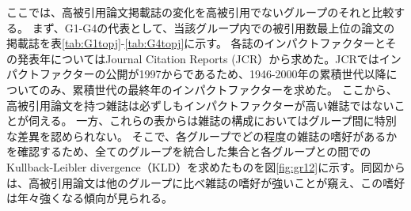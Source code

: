 ここでは、高被引用論文掲載誌の変化を高被引用でないグループのそれと比較する。
まず、G1-G4の代表として、当該グループ内での被引用数最上位の論文の掲載誌を表\ref{tab:G1topj}-\ref{tab:G4topj}に示す。
各誌のインパクトファクターとその発表年についてはJournal Citation Reports  (JCR）\cite{JCR1}から求めた。JCRではインパクトファクターの公開が1997からであるため、1946-2000年の累積世代以降についてのみ、累積世代の最終年のインパクトファクターを求めた。
ここから、高被引用論文を持つ雑誌は必ずしもインパクトファクターが高い雑誌ではないことが伺える。
一方、これらの表からは雑誌の構成においてはグループ間に特別な差異を認められない。
そこで、各グループでどの程度の雑誌の嗜好があるかを確認するため、全てのグループを統合した集合と各グループとの間でのKullback-Leibler divergence（KLD）を求めたものを図\ref{fig:gr12}に示す。同図からは、高被引用論文は他のグループに比べ雑誌の嗜好が強いことが窺え、この嗜好は年々強くなる傾向が見られる。
